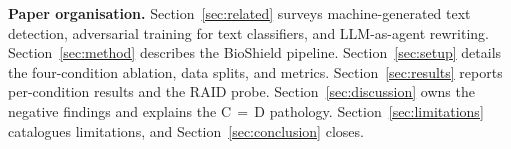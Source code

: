 \textbf{Paper organisation.} Section~\ref{sec:related} surveys
machine-generated text detection, adversarial training for text classifiers,
and LLM-as-agent rewriting. Section~\ref{sec:method} describes the BioShield
pipeline. Section~\ref{sec:setup} details the four-condition ablation, data
splits, and metrics. Section~\ref{sec:results} reports per-condition results
and the RAID probe. Section~\ref{sec:discussion} owns the negative findings
and explains the C\,$=$\,D pathology. Section~\ref{sec:limitations}
catalogues limitations, and Section~\ref{sec:conclusion} closes.
